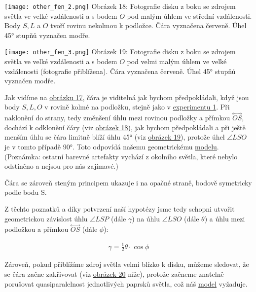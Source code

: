 \documentclass[titlepage]{article}
\begin{document}
 \label{image:18}
\begin{center}
    \texttt{[image: other\_fen\_2.png]}
    \linebreak
    Obrázek 18: Fotografie disku z boku se zdrojem světla ve velké vzdálenosti a s bodem $O$ pod malým úhlem ve střední vzdálenosti. Body $S, L$ a $O$ tvoří rovinu nekolmou k podložce. Čára vyznačena červeně. Úhel 45° stupňů vyznačen modře.
\end{center}

 \label{image:19}
\begin{center}
    \texttt{[image: other\_fen\_3.png]}
    \linebreak
    Obrázek 19: Fotografie disku z boku se zdrojem světla ve velké vzdálenosti a s bodem $O$ pod velmi malým úhlem ve velké vzdálenosti (fotografie přiblížena). Čára vyznačena červeně. Úhel 45° stupňů vyznačen modře.
\end{center}

Jak vidíme na \hyperref[image:17]{obrázku 17}, čára je viditelná jak bychom předpokládali, když jsou body $S, L, O$ v rovině kolmé na podložku, stejně jako v \hyperref[exp:1]{experimentu 1}.
Při naklonění do strany, tedy změnšení úhlu mezi rovinou podložky a přímkou $\overset{\longleftrightarrow}{OS}$, dochází k odklonění čáry (viz \hyperref[image:18]{obrázek 18}), jak bychom předpokládali a při ještě menším úhlu se čára limitně blíží úhlu 45° (viz \hyperref[image:19]{obrázek 19}), protože úhel $\angle LSO$ je v tomto případě 90°. Toto odpovídá našemu geometrickému \hyperref[sec:other_fen]{modelu}.
(Poznámka: ostatní barevné artefakty vychází z okolního světla, které nebylo odstíněno a nejsou pro nás zajímavé.)

Čára se zároveň steným principem ukazuje i na opačné straně, bodově symetricky podle bodu S.

Z těchto poznatků a díky potvrzení naší hypotézy jsme tedy schopni utvořit geometrickou závislost úhlu $\angle LSP$ (dále $\gamma$) na úhlu $\angle LSO$ (dále $\theta$) a úhlu mezi podložkou a přímkou $\overset{\longleftrightarrow}{OS}$ (dále $\phi$):

\begin{equation}\label{eq9}
    \begin{gathered}
        \gamma = \frac{1}{2} \theta \cdot \cos{\phi}
    \end{gathered}
\end{equation}

Zároveň, pokud přiblížíme zdroj světla velmi blízko k disku, můžeme sledovat, že se čára začne zakřivovat (viz \hyperref[image:20]{obrázek 20} níže), protože začneme znatelně porušovat quasiparalelnost jednotlivých paprsků světla, což náš \hyperref[sec:other_fen]{model} vyžaduje.
\end{document}
